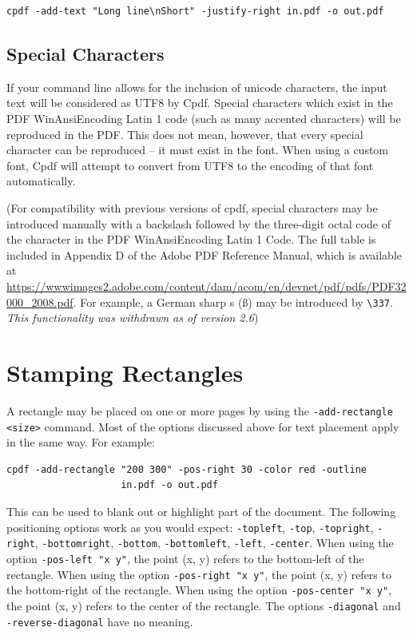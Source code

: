 \documentclass{book}
\begin{document}
\begin{framed}
  \noindent\small\begin{verbatim}cpdf -add-text "Long line\nShort" -justify-right in.pdf -o out.pdf\end{verbatim}
\end{framed}

\subsection{Special Characters}

If your command line allows for the inclusion of unicode characters, the input
text will be considered as UTF8 by Cpdf. Special characters which exist in the
PDF WinAnsiEncoding Latin 1 code (such as many accented characters) will be
reproduced in the PDF. This does not mean, however, that every special
character can be reproduced -- it must exist in the font. When using a custom
font, Cpdf will attempt to convert from UTF8 to the encoding of that font
automatically.

(For compatibility with previous versions of cpdf, special characters may be
introduced manually with a backslash followed by the three-digit octal code of
the character in the PDF WinAnsiEncoding Latin 1 Code. The full table is
included in Appendix D of the Adobe PDF Reference Manual, which is available at
\url{https://wwwimages2.adobe.com/content/dam/acom/en/devnet/pdf/pdfs/PDF32000_2008.pdf}.
For example, a German sharp s (\ss) may be introduced by \verb!\337!.
\textit{This functionality was withdrawn as of version 2.6})

\section{Stamping Rectangles}

A rectangle may be placed on one or more pages by using the \texttt{-add-rectangle <size>} command. Most of the options discussed above for text placement apply in the same way. For example:

\begin{framed}
  \small\begin{verbatim}cpdf -add-rectangle "200 300" -pos-right 30 -color red -outline
                    in.pdf -o out.pdf\end{verbatim}
\end{framed}

\noindent This can be used to blank out or highlight part of the document. The following positioning options work as you would expect: \texttt{-topleft}, \texttt{-top}, \texttt{-topright}, \texttt{-right}, \texttt{-bottomright}, \texttt{-bottom}, \texttt{-bottomleft}, \texttt{-left}, \texttt{-center}. When using the option \texttt{-pos-left "x y"}, the point (x, y) refers to the bottom-left of the rectangle. When using the option \texttt{-pos-right "x y"}, the point (x, y) refers to the bottom-right of the rectangle. When using the option \texttt{-pos-center "x y"}, the point (x, y) refers to the center of the rectangle. The options \texttt{-diagonal} and \texttt{-reverse-diagonal} have no meaning.
\end{document}
